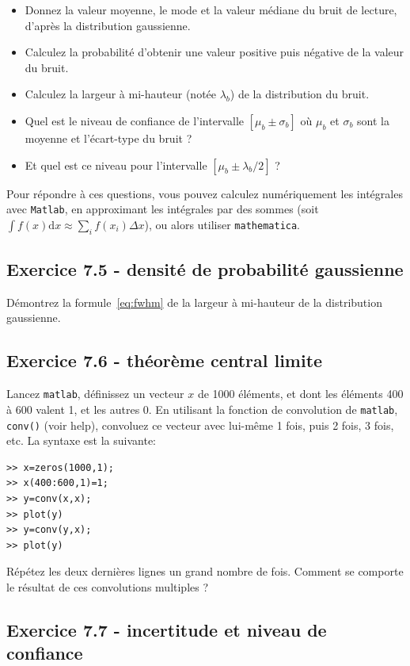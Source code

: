 \begin{itemize}
    \item Donnez la valeur moyenne, le mode et la valeur médiane du bruit de lecture, d'après la distribution gaussienne.
    \item Calculez la probabilité d'obtenir une valeur positive puis négative de la valeur du bruit.
    \item Calculez la largeur à mi-hauteur (notée $\lambda_b$) de la distribution du bruit.
    \item Quel est le niveau de confiance de l'intervalle $[\mu_b\pm\sigma_b]$ où $\mu_b$ et $\sigma_b$ sont la moyenne et l'écart-type du bruit ?
    \item Et quel est ce niveau pour l'intervalle $[\mu_b\pm\lambda_b/2]$ ?
\end{itemize}
Pour répondre à ces questions, vous pouvez calculez numériquement les intégrales avec \texttt{Matlab}, en approximant les intégrales par des sommes (soit $\int f(x)\text{d}x\approx\sum_if(x_i)\Delta x$), ou alors utiliser \texttt{mathematica}.

\subsection*{Exercice 7.5 - densité de probabilité gaussienne}

Démontrez la formule~\ref{eq:fwhm} de la largeur à mi-hauteur de la distribution gaussienne.

\subsection*{Exercice 7.6 - théorème central limite}

Lancez \texttt{matlab}, définissez un vecteur $x$ de 1000 éléments, et dont les éléments 400 à 600 valent 1, et les autres 0. En utilisant la fonction de convolution de \texttt{matlab}, \texttt{conv()} (voir help), convoluez ce vecteur avec lui-même 1 fois, puis 2 fois, 3 fois, etc. La syntaxe est la suivante:
\begin{verbatim}
>> x=zeros(1000,1);
>> x(400:600,1)=1;
>> y=conv(x,x);
>> plot(y)
>> y=conv(y,x);
>> plot(y)
\end{verbatim}
Répétez les deux dernières lignes un grand nombre de fois. Comment se comporte le résultat de ces convolutions multiples ?

\newpage
\subsection*{Exercice 7.7 - incertitude et niveau de confiance}


